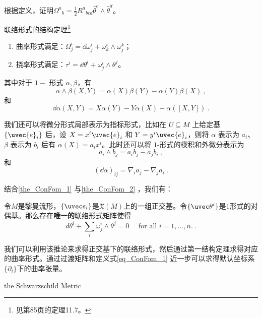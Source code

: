 \begin{exercise}{}
根据定义，证明$\Omega^{a}{ }_{b}=\frac{1}{2} R^{a}{ }_{b c d} \hat{\theta}^{c} \wedge \hat{\theta}^{d}$。
\end{exercise}
\begin{theorem}{联络形式的结构定理\footnote{见\cite{GTM275}第85页的定理11.7。}}\label{the_ConFom_2}
\begin{enumerate}
\item 曲率形式满足：$\Omega^i_j=\dd \omega^i_j+\omega^i_k\wedge\omega^k_j$；
\item 挠率形式满足：$\tau^i=\dd\theta^i+\omega^i_j\wedge\theta^j$。
\end{enumerate}

其中对于 $1-$ 形式 $\alpha, \beta$，有
\begin{equation}
\alpha\wedge \beta(X, Y)=\alpha(X)\beta(Y)-\alpha(Y)\beta(X)~,
\end{equation}
和
\begin{equation}
\dd \alpha(X, Y)=X\alpha(Y)-Y\alpha(X)-\alpha([X, Y])~.
\end{equation}

我们还可以将微分形式局部表示为指标形式，比如在 $U\subseteq M$ 上给定基 $\{\uvec{e}_i\}$ 后，设 $X=x^i\uvec{e}_i$ 和 $Y=y^i\uvec{e}_i$，则将 $\alpha$ 表示为 $a_i$、$\beta$ 表示为 $b_i$ 后有 $\alpha(X)=a_ix^i$。此时还可以将 $1$-形式的楔积和外微分表示为
\begin{equation}
a_i\wedge b_j=a_ib_j-a_jb_i~,
\end{equation}
和
\begin{equation}
(\dd \alpha)_{ij}=\nabla_{i}a_j-\nabla_{j}a_i~.
\end{equation}
\end{theorem}



结合\autoref{the_ConFom_1} 与\autoref{the_ConFom_2} ，我们有：

\begin{corollary}{}
令$M$是黎曼流形，$\{\uvec e_i\}$是$\mathfrak{X}(M)$上的一组正交基。令$\{\uvec\theta^i\}$是1形式的对偶基。那么存在\textbf{唯一的}联络形式矩阵使得
\begin{equation}
d \theta^{i}+\sum_{i} \omega_{j}^{i} \wedge \theta^{j}=0 \quad \text { for all } i=1, \ldots, n .~.
\end{equation}
\end{corollary}

我们可以利用该推论来求得正交基下的联络形式，然后通过第一结构定理求得对应的曲率形式。通过过渡矩阵和定义式\autoref{eq_ConFom_1} 近一步可以求得默认坐标系$\{\partial_i\}$下的曲率张量。
\begin{example}{the Schwarzschild Metric}

\end{example}




